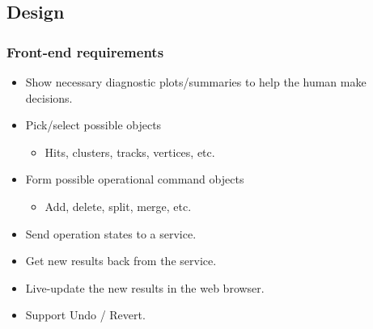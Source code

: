 \documentclass[xcolor=dvipsnames]{beamer}
\begin{document}
\subsection{Design}
\begin{frame}
\end{frame}

\begin{frame}
  \frametitle{Front-end requirements}
  \begin{itemize}
  \item Show necessary diagnostic plots/summaries to
help the human make decisions.
  \item Pick/select possible objects
    \begin{itemize}
    \item Hits, clusters, tracks, vertices, etc.
    \end{itemize}
  \item Form possible operational command objects
    \begin{itemize}
    \item Add, delete, split, merge, etc.
    \end{itemize}
  \item Send operation states to a service.
  \item Get new results back from the service.
  \item Live-update the new results in the web browser.
  \item Support Undo / Revert.
  \end{itemize}
\end{frame}
\end{document}
